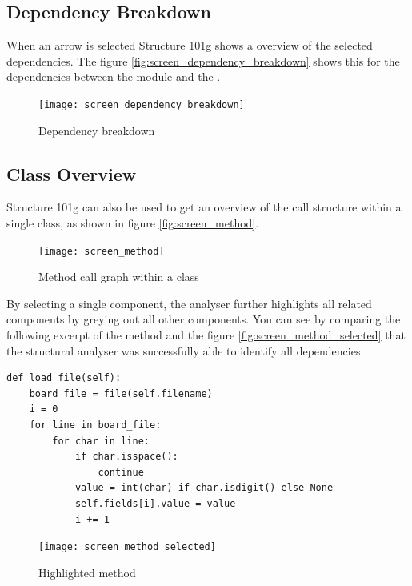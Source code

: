\documentclass[12pt,halfparskip,DIV11,BCOR10mm]{scrreprt}
\begin{document}
\subsection{Dependency Breakdown}

When an arrow is selected Structure 101g shows a overview of the selected dependencies. The figure \vref{fig:screen_dependency_breakdown} shows this for the dependencies between the module  and the . 

\begin{figure}[H]
    \centering
    \texttt{[image: screen\_dependency\_breakdown]}
    \caption{Dependency breakdown}
    \label{fig:screen_dependency_breakdown}
\end{figure}

\subsection{Class Overview}

Structure 101g can also be used to get an overview of the call structure within a single class, as shown in figure \vref{fig:screen_method}. 

\begin{figure}[H]
    \centering
    \texttt{[image: screen\_method]}
    \caption{Method call graph within a class}
    \label{fig:screen_method}
\end{figure}

By selecting a single component, the analyser further highlights all related components by greying out all other components. You can see by comparing the  following excerpt of the method  and the figure \vref{fig:screen_method_selected} that the structural analyser was successfully able to identify all dependencies.

\begin{lstlisting}
def load_file(self):
    board_file = file(self.filename)
    i = 0        
    for line in board_file:
        for char in line:
            if char.isspace():
                continue
            value = int(char) if char.isdigit() else None
            self.fields[i].value = value
            i += 1
\end{lstlisting}

\begin{figure}[H]
    \centering
    \texttt{[image: screen\_method\_selected]}
    \caption{Highlighted method}
    \label{fig:screen_method_selected}
\end{figure}
\end{document}
